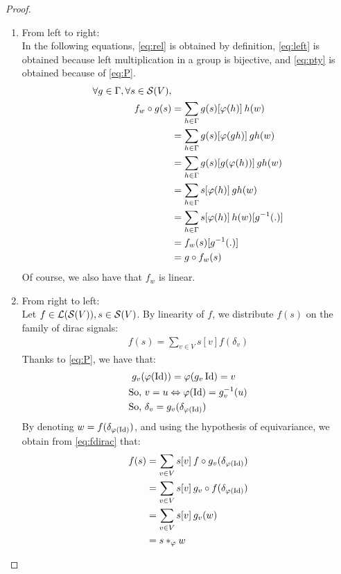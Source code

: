\begin{proof}\begin{enumerate}\item From left to right:\\
In the following equations, \eqref{eq:rel} is obtained by definition, \eqref{eq:left} is obtained because left multiplication in a group is bijective, and \eqref{eq:pty} is obtained because of \eqref{eq:P}.
\begin{align}
\forall g \in \Gamma, \forall s \in \cs(V), & \nonumber\\
f_w \circ g (s) & = \displaystyle \sum_{h \in \Gamma} g(s)[\varphi(h)] \h{2} h(w)\label{eq:rel}\\
 & = \displaystyle \sum_{h \in \Gamma} g(s)[\varphi(gh)] \h{2} gh(w)\label{eq:left}\\
 & = \displaystyle \sum_{h \in \Gamma} g(s)[g(\varphi(h))] \h{2} gh(w)\label{eq:pty}\\
 & = \displaystyle \sum_{h \in \Gamma} s[\varphi(h)] \h{2} gh(w)\nonumber\\
 & = \displaystyle \sum_{h \in \Gamma} s[\varphi(h)] \h{2} h(w)[g^{-1}(.)]\nonumber\\
& = f_w (s) [g^{-1}(.)]\nonumber\\
& = g \circ f_w (s) \nonumber
\end{align}
Of course, we also have that $f_w$ is linear.
\item From right to left:\\
Let $f \in \cl(\cs(V)), s \in \cs(V)$. By linearity of $f$, we distribute $f(s)$ on the family of dirac signals:
\begin{gather}
f(s) = \displaystyle\sum_{v \in V} s[v]f(\delta_v) \label{eq:fdirac}
\end{gather}
Thanks to \eqref{eq:P}, we have that:
\begin{align*}
g_v(&\varphi(\id)) = \varphi(g_v\id) = v\\
\text{So, } & v = u \Leftrightarrow  \varphi(\id) = g_v^{-1}(u)\\
\text{So, } & \delta_v = g_v(\delta_{\varphi(\id)})
\end{align*}
By denoting $w = f(\delta_{\varphi(\id)})$, and using the hypothesis of equivariance, we obtain from \eqref{eq:fdirac} that:
\begin{align*}
f(s) & = \displaystyle\sum_{v \in V} s[v] \h{2} f \circ g_v(\delta_{\varphi(\id)})\\
 & = \displaystyle\sum_{v \in V} s[v] \h{2} g_v \circ f(\delta_{\varphi(\id)})\\
 & = \displaystyle\sum_{v \in V} s[v] \h{2} g_v(w)\\
 & = s \ast_{\varphi} w
\end{align*}
\end{enumerate}
\end{proof}

